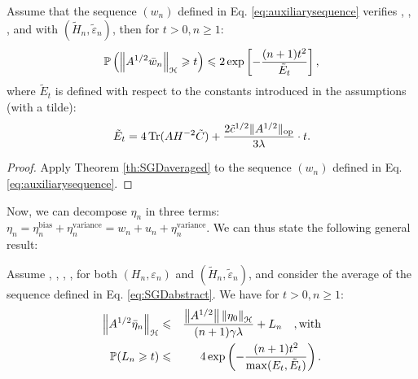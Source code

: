 \begin{corollary}
Assume that the sequence $(w_n)$ defined in Eq. \eqref{eq:auxiliarysequence} verifies , , ,  and  with $(\tilde{H}_n,\tilde{\varepsilon}_n)$, then for $t > 0, n \geqslant 1$:    
\begin{equation*}
\displaystyle{\mathbb P} \left( \left\| A^{1/2} \bar{w}_n  \right\|_{\mathcal H} \geqslant t \right) \leqslant 2 \exp\left[-\frac{(n+1) t^2}{\tilde{E}_t}\right],
\end{equation*}
where $\tilde{E}_t$ is defined with respect to the constants introduced in the assumptions (with a tilde):  
\begin{equation*}
 \tilde{E}_t =   4\operatorname{Tr}(AH^{-2}\tilde{C})+\frac{2\tilde{c}^{1/2} \|A^{1/2}\|_{\textrm {op}}}{3\lambda}\cdot t  .
 \end{equation*}
\end{corollary}

\begin{proof}
Apply Theorem \ref{th:SGDaveraged} to the sequence $(w_n)$ defined in Eq. \eqref{eq:auxiliarysequence}.
\end{proof}

Now, we can decompose $\eta_n$ in three terms: $\eta_n = \eta_n^{\textrm {bias}} + \eta_n^{\textrm {variance}} = w_n + u_n +  \eta_n^{\textrm {variance}}$. We can thus state the following general result:

\begin{theorem}
\label{th:withbias}
Assume , , , ,  for both $(H_n,\varepsilon_n)$ and $(\tilde{H}_n,\tilde{\varepsilon}_n)$, and consider the average of the sequence defined in Eq. \eqref{eq:SGDabstract}. We have for $t > 0, n \geqslant 1$:  
\begin{eqnarray}
\left\|A^{1/2}\bar{\eta}_n \right\|_{\mathcal H} &\leqslant& \frac{ \left\| A^{1/2} \right\|\left\| \eta_0\right\|_{\mathcal H}}{(n+1)\gamma\lambda} + L_n \quad,\text{with} \\
 {\mathbb P}(L_n \geqslant t ) &\leqslant&  4\exp\left(-\frac{(n+1) t^2}{\max(E_t,\tilde{E}_t)} \right).
\end{eqnarray}

\end{theorem}

